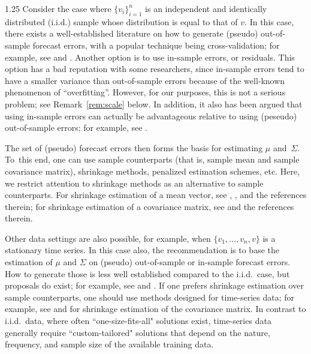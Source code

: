 \documentclass[12pt]{article}
\numberwithin{equation}{section}
\theoremstyle{plain}
\begin{document}
\begin{spacing}{1.25}
Consider the case where $\{v_i\}_{i=1}^n$ is an independent and identically distributed
(i.i.d.) sample whose distribution is equal to that
of $v$. In this case, there exists a well-established
literature on how to generate (pseudo) out-of-sample forecast errors,
with a popular technique being cross-validation; for example,
see \citet[Chapter 12]{efron:hastie:2016} and
\citet[Chapter~7]{hastie:tibshirani:freedman:2017}. Another option is to use in-sample errors, or residuals. This option has a bad 
reputation with some researchers, 
since in-sample errors tend to have a smaller variance
than out-of-sample errors because of the
well-known phenomenon of ``overfitting''. However, for our purposes,
this is not a serious problem; see Remark~\ref{rem:scale}
below. In addition, it also has been argued that using in-sample errors can actually be advantageous relative to using (peseudo) out-of-sample errors;
for example, see \cite{hansen:timmermann:2015}.

The set of (pseudo) forecast errors then forms the basis for estimating
$\mu$ and~$\Sigma$.
To~this end, one can use sample counterparts (that is, sample mean
and sample covariance matrix), shrinkage methods, penalized estimation
schemes, etc. Here, we restrict attention to shrinkage methods as an
alternative to sample counterparts.
For shrinkage
estimation of a mean vector, see \cite{hansen:2016},
\cite{bodnar:okhrin:parolya:2019}, and the references therein; for
shrinkage estimation of a covariance matrix, see
\cite{ledoit:wolf:power} and the references therein.

Other data settings are also possible, for example, when
$\{v_1, \ldots, v_n, v\}$ is a stationary time series. In 
this case also, the recommendation is to base the estimation of $\mu$ and
$\Sigma$ on (pseudo) out-of-sample or in-sample
forecast errors. How
to generate those is less well established compared to the i.i.d.~case,
but proposals do exist; for example, see \cite{bergmeir:benitez:2012} and
\cite{bergmeir:hyndman:koo:2018}. If one prefers shrinkage estimation
over sample counterparts, one should use methods designed for
time-series data; for example, see \cite{sancetta:2008} and
\cite{engle:ledoit:wolf:2019} for shrinkage estimation of the
covariance matrix. In contrast to i.i.d.\ data, where often 
``one-size-fits-all" solutions exist, time-series data
generally require ``custom-tailored" solutions that depend 
on the nature, frequency, and sample size of the available 
training data.

\end{spacing}
\end{document}
